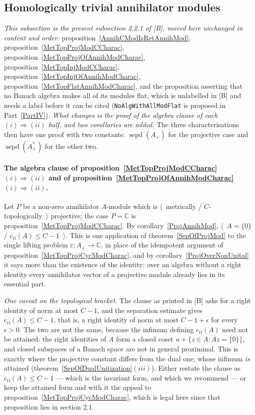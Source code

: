 \documentclass[11pt]{article}
\theoremstyle{plain}
\theoremstyle{definition}
\DeclareMathOperator{\sepd}{sepd}
\newcommand{\cri}{c_{\mathrm{ri}}}
\begin{document}
\subsection{Homologically trivial annihilator modules}\label{SubSectionHomoligicallyTrivialAnnihilatorModules}

\emph{This subsection is the present subsection 2.2.1 of [B], moved here
unchanged in content and order:} proposition~\ref{AnnihCModIsRetAnnihMod},
proposition~\ref{MetTopProjModCCharac},
proposition~\ref{MetTopProjOfAnnihModCharac},
proposition~\ref{MetTopInjModCCharac},
proposition~\ref{MetTopInjOfAnnihModCharac},
proposition~\ref{MetTopFlatAnnihModCharac}, and the proposition asserting that no
Banach algebra makes all of its modules flat, which is unlabelled in [B] and
needs a label before it can be cited (\texttt{NoAlgWithAllModFlat} is proposed in
Part~\ref{PartIV}). \emph{What changes is the proof of the algebra clause of each
$(i)\Rightarrow(ii)$ half, and two corollaries are added.} The three
characterisations then have one proof with two constants: $\sepd(A_+)$ for the
projective case and $\sepd(A_+^*)$ for the other two.

\paragraph{The algebra clause of
proposition~\ref{MetTopProjModCCharac}$(i)\Rightarrow(ii)$ and of
proposition~\ref{MetTopProjOfAnnihModCharac}$(i)\Rightarrow(ii)$.} Let $P$ be a
non-zero annihilator $A$-module which is
$\langle$~metrically / $C$-topologically~$\rangle$ projective; the case
$P=\mathbb{C}$ is proposition~\ref{MetTopProjModCCharac}. By
corollary~\ref{ProjAnnihMod}, $\langle$~$A= \{0 \}$ / $\cri(A)\leq C-1$~$\rangle$.
This is one application of theorem~\ref{SepOfProjMod} to the single lifting
problem $\varepsilon:A_+\to\mathbb{C}$, in place of the idempotent argument of
proposition~\ref{MetTopProjCycModCharac}, and by
corollary~\ref{ProjOverNonUnital} it says more than the existence of the
identity: over an algebra without a right identity every annihilator vector of a
projective module already lies in its essential part.

\emph{One caveat on the topological bracket.} The clause as printed in [B] asks
for a right identity of norm at most $C-1$, and the separation estimate gives
$\cri(A)\leq C-1$, that is, a right identity of norm at most $C-1+\epsilon$ for
every $\epsilon>0$. The two are not the same, because the infimum defining
$\cri(A)$ need not be attained: the right identities of $A$ form a closed coset
$u+ \{z\in A:Az= \{0 \} \}$, and closed subspaces of a Banach space are not in
general proximinal. This is exactly where the projective constant differs from
the dual one, whose infimum \emph{is} attained
(theorem~\ref{SepOfDualUnitization}$(iii)$). Either restate the clause as
$\cri(A)\leq C-1$ --- which is the invariant form, and which we recommend --- or
keep the attained form and with it the appeal to
proposition~\ref{MetTopProjCycModCharac}, which is legal here since that
proposition lies in section 2.1.
\end{document}
